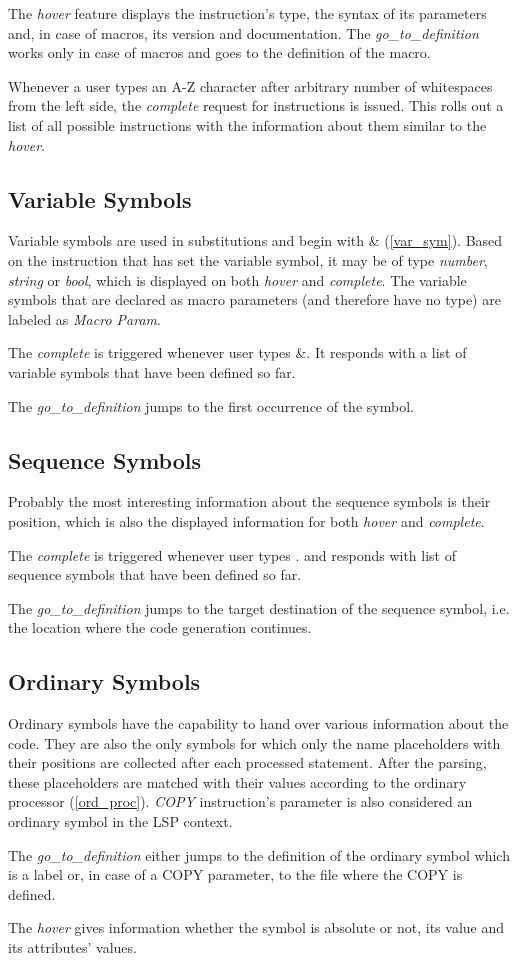 The \emph{hover} feature displays the instruction's type, the syntax of its parameters and, in case of macros, its version and documentation. The \emph{go\_to\_definition} works only in case of macros and goes to the definition of the macro.

Whenever a user types an A-Z character after arbitrary number of whitespaces from the left side, the \emph{complete} request for instructions is issued. This rolls out a list of all possible instructions with the information about them similar to the \emph{hover}.

\subsection{Variable Symbols}

Variable symbols are used in substitutions and begin with \& (\cref{var_sym}). Based on the instruction that has set the variable symbol, it may be of type \emph{number}, \emph{string} or \emph{bool}, which is displayed on both \emph{hover} and \emph{complete}. The variable symbols that are declared as macro parameters (and therefore have no type) are labeled as \emph{Macro Param}.

The \emph{complete} is triggered whenever user types \&. It responds with a list of variable symbols that have been defined so far.

The \emph{go\_to\_definition} jumps to the first occurrence of the symbol.

\subsection{Sequence Symbols}

Probably the most interesting information about the sequence symbols is their position, which is also the displayed information for both \emph{hover} and \emph{complete}.

The \emph{complete} is triggered whenever user types . and responds with list of sequence symbols that have been defined so far.

The \emph{go\_to\_definition} jumps to the target destination of the sequence symbol, i.e. the location where the code generation continues.

\subsection{Ordinary Symbols}

Ordinary symbols have the capability to hand over various information about the code. They are also the only symbols for which only the name placeholders with their positions are collected after each processed statement. After the parsing, these placeholders are matched with their values according to the ordinary processor (\cref{ord_proc}). \emph{COPY} instruction's parameter is also considered an ordinary symbol in the LSP context.  

The \emph{go\_to\_definition} either jumps to the definition of the ordinary symbol which is a label or, in case of a COPY parameter, to the file where the COPY is defined.

The \emph{hover} gives information whether the symbol is absolute or not, its value and its attributes' values. 




